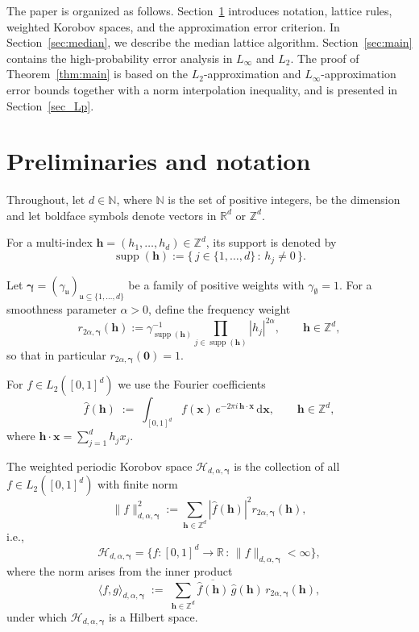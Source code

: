 \documentclass[a4paper,11pt]{article}
\newcommand{\bsh}{\boldsymbol{h}}
\newcommand{\bsx}{\boldsymbol{x}}
\newcommand{\bsgamma}{\boldsymbol{\gamma}}
\newcommand{\NN}{\mathbb{N}}
\newcommand{\RR}{\mathbb{R}}
\newcommand{\ZZ}{\mathbb{Z}}
\newcommand{\Hcal}{\mathcal{H}}
\DeclareMathOperator{\supp}{supp}
\newcommand{\abs}[1]{\left\vert#1\right\vert}
\begin{document}
\medskip

The paper is organized as follows. Section~\ref{sec:preliminaries} introduces notation, lattice rules, weighted Korobov spaces, and the approximation error criterion. In Section~\ref{sec:median}, we describe the median lattice algorithm. Section~\ref{sec:main} contains the high-probability error analysis in $L_\infty$ and $L_2$. The proof of Theorem~\ref{thm:main} is based on the $L_2$-approximation and $L_\infty$-approximation error bounds together with a norm interpolation inequality, and is presented in Section~\ref{sec_Lp}.





\section{Preliminaries and notation}\label{sec:preliminaries}


Throughout, let \(d\in \NN\), where $\NN$ is the set of positive integers, be the dimension and let boldface symbols denote vectors in \(\RR^d\) or \(\ZZ^d\). 


For a multi-index \(\bsh=(h_1,\ldots,h_d)\in\ZZ^d\), its support is denoted by
\[
\supp(\bsh):=\{\,j\in\{1,\ldots,d\}\,:\, h_j\neq 0\,\}.
\]

Let \(\bsgamma=(\gamma_{\mathfrak u})_{\mathfrak u\subseteq\{1,\ldots,d\}}\) be a family of positive weights with \(\gamma_{\emptyset}=1\). For a smoothness parameter \(\alpha>0\), define the frequency weight
\[
r_{2\alpha,\bsgamma} (\bsh):=\gamma_{\supp(\bsh)}^{-1}\prod_{j\in \supp(\bsh)} \abs{h_j}^{2\alpha},
\qquad \bsh\in\ZZ^d,
\]
so that in particular \(r_{2\alpha,\bsgamma}(\boldsymbol 0)=1\).


For \(f\in L_2([0,1]^d)\) we use the Fourier coefficients
\[
\widehat{f}(\bsh)\;:=\;\int_{[0,1]^d} f(\bsx)\,e^{-2\pi i\,\bsh\cdot\bsx}\, \mathrm d\bsx,
\qquad \bsh\in\ZZ^d,
\]
where \(\bsh\cdot\bsx=\sum_{j=1}^d h_j x_j\).

The weighted periodic Korobov space \(\Hcal_{d,\alpha,\bsgamma}\) is the collection of all \(f\in L_2([0,1]^d)\) with finite norm
\[
  \|f\|_{d,\alpha,\bsgamma}^2:=\sum_{\bsh\in\ZZ^d} \abs{\widehat{f}({\bsh})}^2 r_{2\alpha,\bsgamma}(\bsh),
\]
i.e.,
\begin{equation}\label{Korspace}
\Hcal_{d,\alpha, \bsgamma} = \{ f: [0,1]^d \to \RR\,:\, \|f\|_{d, \alpha, \bsgamma} < \infty\},
\end{equation}
where the norm arises from the inner product
\[
\langle f,g\rangle_{d,\alpha,\bsgamma}\;:=\;\sum_{\bsh\in\ZZ^d} \overline{\widehat f(\bsh)}\,\widehat g(\bsh)\, r_{2\alpha,\bsgamma}(\bsh),
\]
under which $\Hcal_{d,\alpha,\bsgamma}$ is a Hilbert space.
\end{document}

